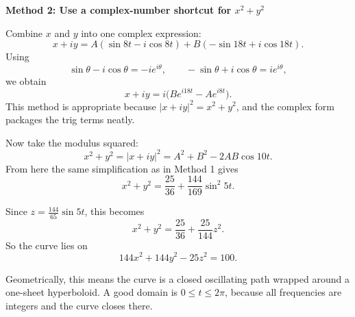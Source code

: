 \documentclass[a4paper,12pt,twocolumn]{article}
\newenvironment{solutionbox}{\begin{framed}}{\end{framed}}
\begin{document}
\begin{solutionbox}
\textbf{Method 2: Use a complex-number shortcut for \(x^2+y^2\)}

\begin{steps}
\item Combine \(x\) and \(y\) into one complex expression:
\[
x+iy
=A(\sin 8t-i\cos 8t)+B(-\sin 18t+i\cos 18t).
\]
Using
\[
\sin \theta-i\cos\theta=-ie^{i\theta},
\qquad
-\sin\theta+i\cos\theta=ie^{i\theta},
\]
we obtain
\[
x+iy=i\bigl(Be^{i18t}-Ae^{i8t}\bigr).
\]
This method is appropriate because \(|x+iy|^2=x^2+y^2\), and the complex form packages the trig terms neatly.

\item Now take the modulus squared:
\[
x^2+y^2
=|x+iy|^2
=A^2+B^2-2AB\cos 10t.
\]
From here the same simplification as in Method 1 gives
\[
x^2+y^2=\frac{25}{36}+\frac{144}{169}\sin^2 5t.
\]

\item Since \(z=\frac{144}{65}\sin 5t\), this becomes
\[
x^2+y^2=\frac{25}{36}+\frac{25}{144}z^2.
\]
So the curve lies on
\[
\boxed{144x^2+144y^2-25z^2=100.}
\]

\item Geometrically, this means the curve is a closed oscillating path wrapped around a one-sheet hyperboloid. A good domain is \(0\le t\le 2\pi\), because all frequencies are integers and the curve closes there.
\end{steps}
\end{solutionbox}
\end{document}
